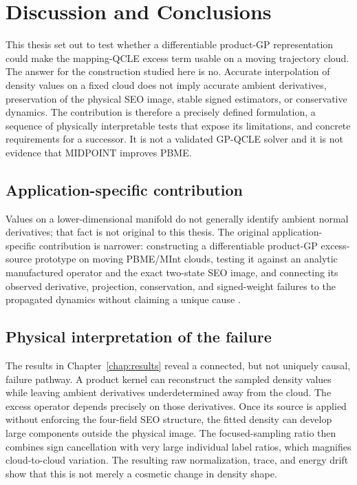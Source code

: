 \chapter{Discussion and Conclusions}
\label{chap:discussion-outlook}

This thesis set out to test whether a differentiable product-GP representation
could make the mapping-QCLE excess term usable on a moving trajectory cloud.
The answer for the construction studied here is no. Accurate interpolation of
density values on a fixed cloud does not imply accurate ambient derivatives,
preservation of the physical SEO image, stable signed estimators, or
conservative dynamics. The contribution is therefore a precisely defined
formulation, a sequence of physically interpretable tests that expose its
limitations, and concrete requirements for a successor. It is not a validated
GP-QCLE solver and it is not evidence that MIDPOINT improves PBME.

\section{Application-specific contribution}
\label{sec:discussion-contribution}

Values on a lower-dimensional manifold do not generally identify ambient
normal derivatives; that fact is not original to this thesis. The original
application-specific contribution is narrower: constructing a differentiable
product-GP excess-source prototype on moving PBME/MInt clouds, testing it
against an analytic manufactured operator and the exact two-state SEO image,
and connecting its observed derivative, projection, conservation, and
signed-weight failures to the propagated dynamics without claiming a unique
cause
\cite{Kim2008JCP,Kelly2012JCP,Raissi2017LinearGP,
Solak2002DerivativeGP,CockayneOatesSullivanGirolami2019}.

\section{Physical interpretation of the failure}
\label{sec:discussion-evidence}

The results in Chapter~\ref{chap:results} reveal a connected, but not uniquely
causal, failure pathway. A product kernel can reconstruct the sampled density
values while leaving ambient derivatives underdetermined away from the cloud.
The excess operator depends precisely on those derivatives. Once its source
is applied without enforcing the four-field SEO structure, the fitted density
can develop large components outside the physical image. The focused-sampling
ratio then combines sign cancellation with very large individual label ratios,
which magnifies cloud-to-cloud variation. The resulting raw normalization,
trace, and energy drift show that this is not merely a cosmetic change in
density shape.

